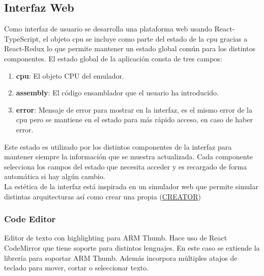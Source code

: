     \subsection{Interfaz Web}
    {
        Como interfaz de usuario se desarrolla una plataforma web usando React-TypeScript,
        el objeto cpu se incluye como parte del estado de la cpu gracias a React-Redux lo que
        permite mantener un estado global común para los distintos componentes. El estado global
        de la aplicación consta de tres campos:

        \begin{enumerate}
            \item \textbf{cpu}: El objeto CPU del emulador.
            \item \textbf{assembly}: El código ensamblador que el usuario ha introducido.
            \item \textbf{error}: Mensaje de error para mostrar en la interfaz, es el mismo error de la cpu pero se mantiene en el estado para más rápido acceso, en caso de haber error.
        \end{enumerate}

        Este estado es utilizado por los distintos componentes de la interfaz para mantener siempre la información que se muestra actualizada.
        Cada componente selecciona los campos del estado que necesita acceder y es recargado
        de forma automática si hay algún cambio. \\

        La estética de la interfaz está inspirada en un simulador web que permite simular distintas arquitecturas
        así como crear una propia (\href{https://creatorsim.github.io/creator/}{CREATOR})

        
        \clearpage
        
        \subsubsection{Code Editor}
        {
            Editor de texto con highlighting para ARM Thumb. Hace uso de React CodeMirror que tiene soporte para distintos lenguajes. En este caso se extiende la librería para soportar ARM Thumb. Además incorpora múltiples atajos de teclado para mover, cortar o seleccionar texto.
            
}}
